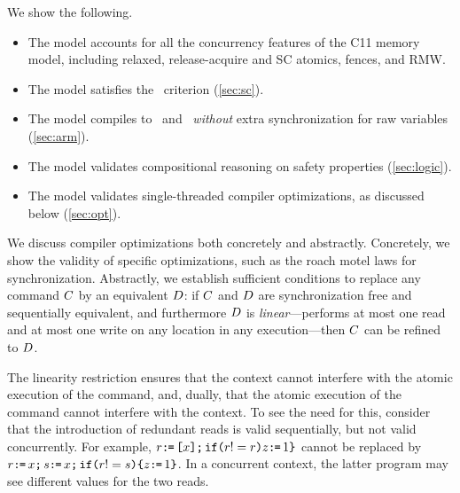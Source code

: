 We show the following.
\begin{itemize}
\item The model accounts for all the concurrency features of the C11 memory model, including relaxed, release-acquire and SC atomics, fences, and RMW.

\item The model satisfies the \drfsc\ criterion  (\textsection\ref{sec:sc}).

\item The model compiles to \armeight\ and \tso\ {\em without} extra synchronization for raw variables  (\textsection\ref{sec:arm}).

\item The model validates compositional reasoning on safety properties (\textsection\ref{sec:logic}).  

\item The model validates single-threaded compiler optimizations, as discussed below (\textsection\ref{sec:opt}).
\end{itemize}

We discuss compiler optimizations both concretely and abstractly.
Concretely, we show the validity of specific optimizations, such as the roach motel laws for synchronization.
Abstractly, we establish sufficient conditions to replace any command $C$ by an equivalent $D$: if
$C$ and $D$ are synchronization free and sequentially equivalent, and furthermore $D$ is \emph{linear}---performs at most one read and at most one write on any location in any execution---then $C$ can be refined to $D$.  

The linearity restriction ensures that the context cannot interfere with the atomic execution of the command, and, dually, that the atomic execution of the command cannot interfere with the context.   To see the need for this, consider that the introduction of redundant reads is valid sequentially, but not valid concurrently. For example, $r \texttt{:}\mkern-1mu\texttt{=}\, \texttt{[}x\texttt{]} \texttt{;}\,\allowbreak \texttt{if}\allowbreak\texttt{(}r != r\texttt{)} z \texttt{:}\mkern-1mu\texttt{=}\, 1 \texttt{\}}$ cannot be replaced by $r \texttt{:}\mkern-1mu\texttt{=}\, x \texttt{;}\,\allowbreak s \texttt{:}\mkern-1mu\texttt{=}\, x  \texttt{;}\,\allowbreak  \texttt{if}\allowbreak\texttt{(}r != s\texttt{)} \allowbreak\texttt{\{} z \texttt{:}\mkern-1mu\texttt{=}\, 1 \texttt{\}}$.  In a concurrent context, the latter program may see different values for the two reads.

